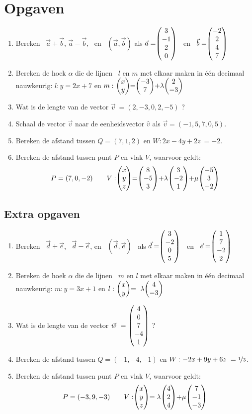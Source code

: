 \newpage
\section{Opgaven}
\begin{enumerate}
    \setlength{\itemsep}{10pt}
	\item  Bereken \ $ \vec{a} + \vec{b} $, \quad $ \vec{a} - \vec{b} $, \ en \ $  (\vec{a} , \vec{b}) $  als $ \vec{a} = \vecvier{3}{-1}{2}{0}  $ \  en \  $  \vec{b} =  \vecvier{-2}{2}{4}{7} $ 
	
	\item  Bereken de hoek $\alpha$ die de  lijnen \ $  l $ en $ m $ met elkaar maken in één decimaal nauwkeurig:
	$ l:  y = 2x +7  $ en $ m: \  \vectwee{x}{y} = \vectwee{-3}{7} + \lambda \vectwee{2}{-3}  $
	
	\item Wat is de lengte van de vector $  \vec{v} \ = (2, -3, 0, 2, -5) $ ?
	
	\item Schaal de vector $  \vec{v} $ naar de eenheidsvector $\hat{v}$ als $ \vec{v} = (-1, 5, 7, 0, 5) $.
	
	\item Bereken de afstand tussen  $  Q = (7,1,2)  $ en $ W:2x - 4y +2z \ = -2 $.
  
	\item Bereken de afstand tussen punt $P$ en vlak $V$, waarvoor geldt: 
    \[
      P=(7,0,-2) \qquad V:\vecdrie{x}{y}{z} = \vecdrie{8}{-5}{3} + \lambda\vecdrie{3}{-2}{1} + \mu \vecdrie{-5}{3}{-2} 
    \]
\end{enumerate}

\subsection{Extra opgaven}
\begin{enumerate}
    \setlength{\itemsep}{10pt}
	\item Bereken \ $ \vec{d} + \vec{e} $, \ $ \vec{d} - \vec{e} $, en \ $  (\vec{d} , \vec{e}) $ \ als 
	\quad $ \vec{d} = \vecvier{3}{-2}{0}{5}  $ \  en \  $  \vec{e} =  \vecvier{1}{7}{-2}{2} $
	
	\item  Bereken de hoek $\alpha$ die de  lijnen \ $  m $ en $ l $ met elkaar maken in één decimaal nauwkeurig:
	$ m:  y = 3x + 1  $ en $ l: \  \vectwee{x}{y} = \  \lambda \vectwee{4}{-3} $
	
	\item Wat is de lengte van de vector $  \vec{w} \ = \ \vecvijf{4}{0}{7}{-4}{1} $ ?

    \item Bereken de afstand tussen  $  Q = (-1,-4,-1)  $ en $W:-2x + 9y + 6z \ = \nicefrac{1}{3} $. 

	\item Bereken de afstand tussen punt $P$ en vlak $V$, waarvoor geldt: 
    \[P = (-3,9,-3)  \qquad V:\vecdrie{x}{y}{z} =\lambda\vecdrie{4}{2}{4} + \mu\vecdrie{7}{-1}{-3} \]
\end{enumerate}

